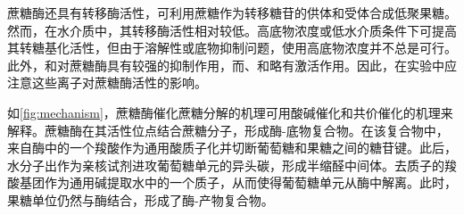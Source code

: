 
蔗糖酶还具有转移酶活性，可利用蔗糖作为转移糖苷的供体和受体合成低聚果糖。然而，在水介质中，其转移酶活性相对较低。高底物浓度或低水介质条件下可提高其转糖基化活性，但由于溶解性或底物抑制问题，使用高底物浓度并不总是可行。此外，和对蔗糖酶具有较强的抑制作用，而、和略有激活作用。因此，在实验中应注意这些离子对蔗糖酶活性的影响。

如\autoref{fig:mechanism}，蔗糖酶催化蔗糖分解的机理可用酸碱催化和共价催化的机理来解释。蔗糖酶在其活性位点结合蔗糖分子，形成酶-底物复合物。在该复合物中，来自酶中的一个羧酸作为通用酸质子化并切断葡萄糖和果糖之间的糖苷键。此后，水分子出作为亲核试剂进攻葡萄糖单元的异头碳，形成半缩醛中间体。去质子的羧酸基团作为通用碱提取水中的一个质子，从而使得葡萄糖单元从酶中解离。此时，果糖单位仍然与酶结合，形成了酶-产物复合物。

